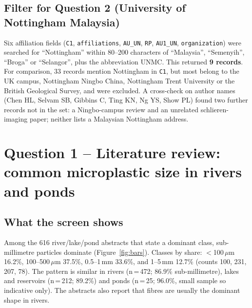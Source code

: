 \documentclass[11pt,a4paper]{article}
\newcommand{\um}{\,\ensuremath{\mu}m}
\begin{document}
\subsection{Filter for Question 2 (University of Nottingham Malaysia)}
Six affiliation fields (\texttt{C1}, \texttt{affiliations}, \texttt{AU\_UN}, \texttt{RP}, \texttt{AU1\_UN}, \texttt{organization}) were searched for ``Nottingham'' within 80--200 characters of ``Malaysia'', ``Semenyih'', ``Broga'' or ``Selangor'', plus the abbreviation UNMC. This returned \textbf{9 records}. For comparison, 33 records mention Nottingham in \texttt{C1}, but most belong to the UK campus, Nottingham Ningbo China, Nottingham Trent University or the British Geological Survey, and were excluded. A cross-check on author names (Chen HL, Selvam SB, Gibbins C, Ting KN, Ng YS, Show PL) found two further records not in the set: a Ningbo-campus review and an unrelated schlieren-imaging paper; neither lists a Malaysian Nottingham address.

\section{Question 1 -- Literature review: common microplastic size in rivers and ponds}
\subsection{What the screen shows}
Among the 616 river/lake/pond abstracts that state a dominant class, sub-millimetre particles dominate (Figure~\ref{fig:bars}). Classes by share: $<$100\um{} 16.2\%, 100--500\um{} 37.5\%, 0.5--1\,mm 33.6\%, and 1--5\,mm 12.7\% (counts 100, 231, 207, 78). The pattern is similar in rivers (n\,=\,472; 86.9\% sub-millimetre), lakes and reservoirs (n\,=\,212; 89.2\%) and ponds (n\,=\,25; 96.0\%, small sample so indicative only). The abstracts also report that fibres are usually the dominant shape in rivers.
\end{document}
